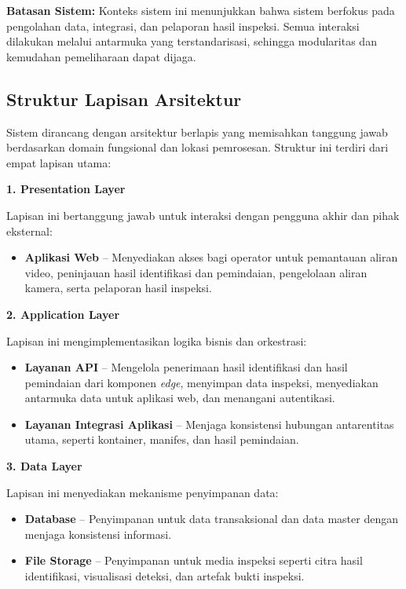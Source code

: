 \textbf{Batasan Sistem:}
Konteks sistem ini menunjukkan bahwa sistem berfokus pada pengolahan data, integrasi, dan pelaporan hasil inspeksi. Semua interaksi dilakukan melalui antarmuka yang terstandarisasi, sehingga modularitas dan kemudahan pemeliharaan dapat dijaga.

\subsection{Struktur Lapisan Arsitektur}
\label{subsec:arsitektur-komponen-high-level}

Sistem dirancang dengan arsitektur berlapis yang memisahkan tanggung jawab berdasarkan domain fungsional dan lokasi pemrosesan. Struktur ini terdiri dari empat lapisan utama:

\textbf{1. Presentation Layer}

Lapisan ini bertanggung jawab untuk interaksi dengan pengguna akhir dan pihak eksternal:
\begin{itemize}
  \item \textbf{Aplikasi Web} -- Menyediakan akses bagi operator untuk pemantauan aliran video, peninjauan hasil identifikasi dan pemindaian, pengelolaan aliran kamera, serta pelaporan hasil inspeksi.
\end{itemize}

\textbf{2. Application Layer}

Lapisan ini mengimplementasikan logika bisnis dan orkestrasi:
\begin{itemize}
  \item \textbf{Layanan API} -- Mengelola penerimaan hasil identifikasi dan hasil pemindaian dari komponen \textit{edge}, menyimpan data inspeksi, menyediakan antarmuka data untuk aplikasi web, dan menangani autentikasi.
  \item \textbf{Layanan Integrasi Aplikasi} -- Menjaga konsistensi hubungan antarentitas utama, seperti kontainer, manifes, dan hasil pemindaian.
\end{itemize}

\textbf{3. Data Layer}

Lapisan ini menyediakan mekanisme penyimpanan data:
\begin{itemize}
  \item \textbf{Database} -- Penyimpanan untuk data transaksional dan data master dengan menjaga konsistensi informasi.
  \item \textbf{File Storage} -- Penyimpanan untuk media inspeksi seperti citra hasil identifikasi, visualisasi deteksi, dan artefak bukti inspeksi.
\end{itemize}


